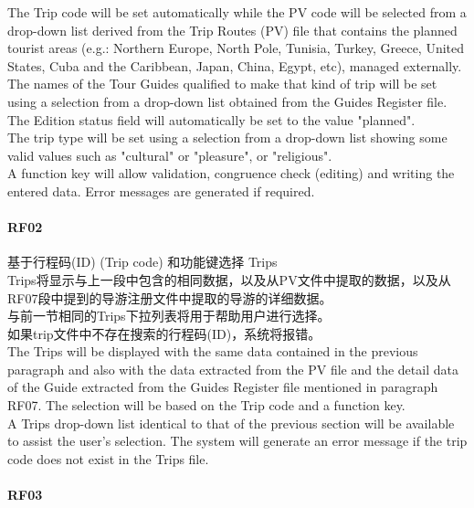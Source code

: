 The Trip code will be set automatically while the PV code will be
selected from a drop-down list derived from the Trip Routes (PV) file
that contains the planned tourist areas (e.g.: Northern Europe, North
Pole, Tunisia, Turkey, Greece, United States, Cuba and the Caribbean,
Japan, China, Egypt, etc), managed externally.\\
The names of the Tour Guides qualified to make that kind of trip will be
set using a selection from a drop-down list obtained from the Guides
Register file.\\
The Edition status field will automatically be set to the value
"planned".\\
The trip type will be set using a selection from a drop-down list
showing some valid values such as "cultural" or "pleasure", or
"religious".\\
A function key will allow validation, congruence check (editing) and
writing the entered data. Error messages are generated if required.\\

\hypertarget{rf02-2}{%
\paragraph{RF02}\label{rf02-2}}

基于行程码(ID) (Trip code) 和功能键选择 Trips\\
Trips将显示与上一段中包含的相同数据，以及从PV文件中提取的数据，以及从RF07段中提到的导游注册文件中提取的导游的详细数据。\\
与前一节相同的Trips下拉列表将用于帮助用户进行选择。\\
如果trip文件中不存在搜索的行程码(ID)，系统将报错。\\
The Trips will be displayed with the same data contained in the previous
paragraph and also with the data extracted from the PV file and the
detail data of the Guide extracted from the Guides Register file
mentioned in paragraph RF07. The selection will be based on the Trip
code and a function key.\\
A Trips drop-down list identical to that of the previous section will be
available to assist the user's selection. The system will generate an
error message if the trip code does not exist in the Trips file.

\hypertarget{rf03-2}{%
\paragraph{RF03}\label{rf03-2}}

